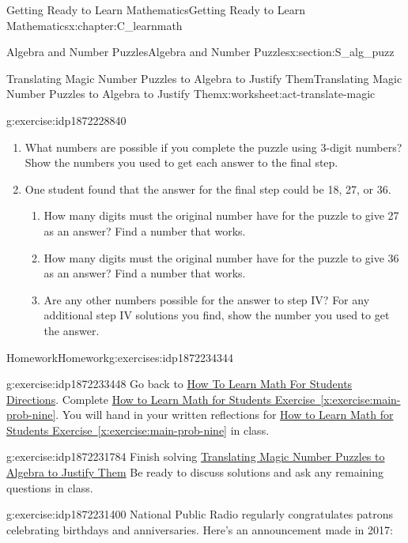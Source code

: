 \documentclass[oneside,10pt,]{book}
\newcommand{\xreffont}{\relax}
\numberwithin{equation}{chapter}
\begin{document}
\begin{chapterptx}{Getting Ready to Learn Mathematics}{}{Getting Ready to Learn Mathematics}{}{}{x:chapter:C_learnmath}
\begin{sectionptx}{Algebra and Number Puzzles}{}{Algebra and Number Puzzles}{}{}{x:section:S_alg_puzz}
\begin{worksheet-subsection}{Translating Magic Number Puzzles to Algebra to Justify Them}{}{Translating Magic Number Puzzles to Algebra to Justify Them}{}{}{x:worksheet:act-translate-magic}
\begin{divisionexercise}{6}{}{}{g:exercise:idp1872228840}
\begin{enumerate}[font=\bfseries,label=(\alph*),ref=\alph*]
\item{}What numbers are possible if you complete the puzzle using 3-digit numbers? Show the numbers you used to get each answer to the final step.%
\item{}One student found that the answer for the final step could be 18, 27, or 36.%
\begin{enumerate}[font=\bfseries,label=(\roman*),ref=\theenumi.\roman*]
\item{}How many digits must the original number have for the puzzle to give 27 as an answer? Find a number that works.%
\item{}How many digits must the original number have for the puzzle to give 36 as an answer? Find a number that works.%
\item{}Are any other numbers possible for the answer to step IV? For any additional step IV solutions you find, show the number you used to get the answer.%
\end{enumerate}
\end{enumerate}
\end{divisionexercise}%
\end{worksheet-subsection}
\restoregeometry
%
%
\typeout{************************************************}
\typeout{************************************************}
%
\begin{exercises-subsection}{Homework}{}{Homework}{}{}{g:exercises:idp1872234344}
\begin{divisionexercise}{1}{}{}{g:exercise:idp1872233448}%
Go back to \hyperlink{x:paragraphs:htlmfs-directions}{How To Learn Math For Students Directions}. Complete \hyperref[x:exercise:main-prob-nine]{How to Learn Math for Students Exercise~{\xreffont\ref{x:exercise:main-prob-nine}}}. You will hand in your written reflections for \hyperref[x:exercise:main-prob-nine]{How to Learn Math for Students Exercise~{\xreffont\ref{x:exercise:main-prob-nine}}} in class.%
\end{divisionexercise}%
\begin{divisionexercise}{2}{}{}{g:exercise:idp1872231784}%
Finish solving \hyperref[x:worksheet:act-translate-magic]{Translating Magic Number Puzzles to Algebra to Justify Them} Be ready to discuss solutions and ask any remaining questions in class.%
\end{divisionexercise}%
\begin{divisionexercise}{3}{}{}{g:exercise:idp1872231400}%
National Public Radio regularly congratulates patrons celebrating birthdays and anniversaries. Here's an announcement made in 2017: \begin{quote}%

\end{quote}
\end{divisionexercise}
\end{exercises-subsection}
\end{sectionptx}
\end{chapterptx}
\end{document}
